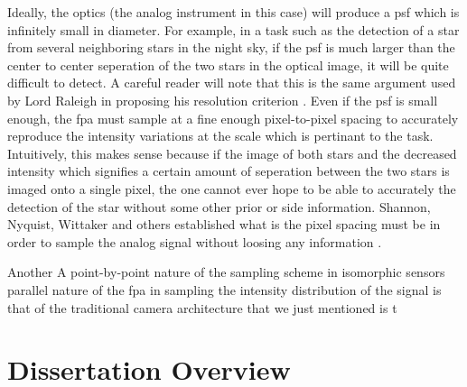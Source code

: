 Ideally, the optics (the analog instrument in this case) will produce a \gls{psf} which is infinitely small in diameter. For example, in a task such as the detection of a star from several neighboring stars in the night sky, if the \gls{psf} is much larger than the center to center seperation of the two stars in the optical image, it will be quite difficult to detect. A careful reader will note that this is the same argument used by Lord Raleigh in proposing his resolution criterion \cite{rayleigh1879investigations}. Even if the \gls{psf} is small enough, the \gls{fpa} must sample at a fine enough pixel-to-pixel spacing to accurately reproduce the intensity variations at the scale which is pertinant to the task. Intuitively, this makes sense because if the image of both stars and the decreased intensity which signifies a certain amount of seperation between the two stars is imaged onto a single pixel, the one cannot ever hope to be able to accurately the detection of the star without some other prior or side information. Shannon, Nyquist, Wittaker and others established what is the pixel spacing must be in order to sample the analog signal without loosing any information \cite{shannon1949communication, nyquist1924certain, shannon1949communication}. 

Another 
A  point-by-point nature of the sampling scheme in isomorphic sensors parallel nature of the \gls{fpa} in sampling the intensity distribution of the signal is that of the traditional camera architecture that we just mentioned is t
\section{Dissertation Overview}





%  
%


